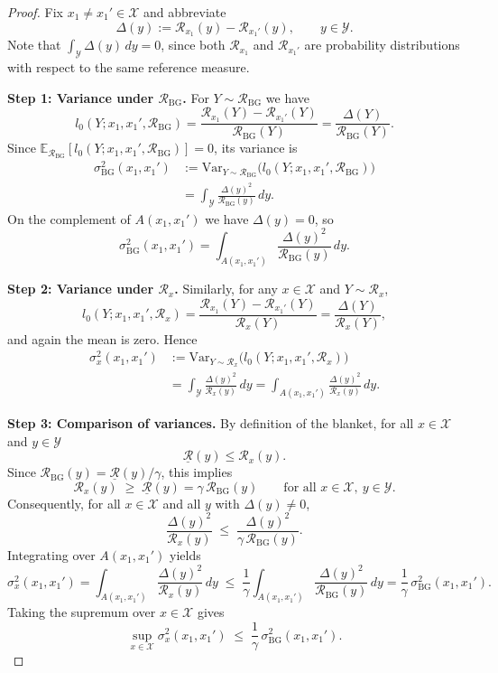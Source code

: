\documentclass[10pt,a4paper]{amsart}
\begin{document}
\begin{proof}
Fix $x_1\neq x_1'\in\mathcal X$ and abbreviate
\[
  \Delta(y)
  := \mathcal R_{x_1}(y) - \mathcal R_{x_1'}(y),
  \qquad y\in\mathcal Y.
\]
Note that $\int_{\mathcal Y}\Delta(y)\,dy=0$, since both
$\mathcal R_{x_1}$ and $\mathcal R_{x_1'}$ are probability distributions
with respect to the same reference measure.

\textbf{Step 1: Variance under $\mathcal R_{\mathrm{BG}}$.}
For $Y\sim\mathcal R_{\mathrm{BG}}$ we have
\[
  l_0(Y;x_1,x_1',\mathcal R_{\mathrm{BG}})
  = \frac{\mathcal R_{x_1}(Y)-\mathcal R_{x_1'}(Y)}
         {\mathcal R_{\mathrm{BG}}(Y)}
  = \frac{\Delta(Y)}{\mathcal R_{\mathrm{BG}}(Y)}.
\]
Since
$\mathbb E_{\mathcal R_{\mathrm{BG}}}[l_0(Y;x_1,x_1',\mathcal R_{\mathrm{BG}})]
= 0$, its variance is
\begin{align*}
  \sigma_{\mathrm{BG}}^2(x_1,x_1')
  &:= \mathrm{Var}_{Y\sim\mathcal R_{\mathrm{BG}}}
      \bigl(l_0(Y;x_1,x_1',\mathcal R_{\mathrm{BG}})\bigr)\\
  &= \int_{\mathcal Y}
       \frac{\Delta(y)^2}{\mathcal R_{\mathrm{BG}}(y)}\,dy.
\end{align*}
On the complement of $A(x_1,x_1')$ we have $\Delta(y)=0$, so
\[
  \sigma_{\mathrm{BG}}^2(x_1,x_1')
  = \int_{A(x_1,x_1')}
      \frac{\Delta(y)^2}{\mathcal R_{\mathrm{BG}}(y)}\,dy.
\]

\textbf{Step 2: Variance under $\mathcal R_x$.}
Similarly, for any $x\in\mathcal X$ and $Y\sim\mathcal R_x$,
\[
  l_0(Y;x_1,x_1',\mathcal R_x)
  = \frac{\mathcal R_{x_1}(Y)-\mathcal R_{x_1'}(Y)}
         {\mathcal R_x(Y)}
  = \frac{\Delta(Y)}{\mathcal R_x(Y)},
\]
and again the mean is zero. Hence
\begin{align*}
  \sigma_x^2(x_1,x_1')
  &:= \mathrm{Var}_{Y\sim\mathcal R_x}
      \bigl(l_0(Y;x_1,x_1',\mathcal R_x)\bigr)\\
  &= \int_{\mathcal Y}
       \frac{\Delta(y)^2}{\mathcal R_x(y)}\,dy
   = \int_{A(x_1,x_1')}
       \frac{\Delta(y)^2}{\mathcal R_x(y)}\,dy.
\end{align*}

\textbf{Step 3: Comparison of variances.}
By definition of the blanket, for all $x\in\mathcal X$ and $y\in\mathcal Y$
\[
  \underline{\mathcal R}(y)
  \le \mathcal R_x(y).
\]
Since
$\mathcal R_{\mathrm{BG}}(y)
 = \underline{\mathcal R}(y)/\gamma$, this implies
\[
  \mathcal R_x(y)
  \;\ge\;
  \underline{\mathcal R}(y)
  = \gamma\,\mathcal R_{\mathrm{BG}}(y)
  \qquad\text{for all }x\in\mathcal X,\ y\in\mathcal Y.
\]
Consequently, for all $x\in\mathcal X$ and all $y$ with $\Delta(y)\neq 0$,
\[
  \frac{\Delta(y)^2}{\mathcal R_x(y)}
  \;\le\;
  \frac{\Delta(y)^2}{\gamma\,\mathcal R_{\mathrm{BG}}(y)}.
\]
Integrating over $A(x_1,x_1')$ yields
\[
  \sigma_x^2(x_1,x_1')
  = \int_{A(x_1,x_1')}
      \frac{\Delta(y)^2}{\mathcal R_x(y)}\,dy
  \;\le\;
  \frac{1}{\gamma}
  \int_{A(x_1,x_1')}
      \frac{\Delta(y)^2}{\mathcal R_{\mathrm{BG}}(y)}\,dy
  = \frac{1}{\gamma}\,\sigma_{\mathrm{BG}}^2(x_1,x_1').
\]
Taking the supremum over $x\in\mathcal X$ gives
\[
  \sup_{x\in\mathcal X} \sigma_x^2(x_1,x_1')
  \;\le\;
  \frac{1}{\gamma}\,\sigma_{\mathrm{BG}}^2(x_1,x_1').
\]


\end{proof}
\end{document}

